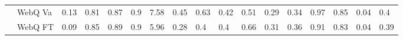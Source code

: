 \begin{table*}[t]
{\begin{tabular}{@{}ll|llll|llll|lll|ll|ll@{}}
                           & WebQ Va              & 0.13                                                                    & 0.81                                                                     & 0.87                                                                  & 0.9                                                                   & 7.58                                                                    & 0.45                                                                  & 0.63                                                                  & 0.42                                                                   & 0.51                                                                    & 0.29                                                                  & 0.34                                                                   & 0.97                                                                   & 0.85                                                                   & 0.04                                                                     & 0.4                                                                      \\
                           & WebQ FT              & 0.09                                                                    & 0.85                                                                     & 0.89                                                                  & 0.9                                                                   & 5.96                                                                    & 0.28                                                                  & 0.4                                                                   & 0.4                                                                    & 0.66                                                                    & 0.31                                                                  & 0.36                                                                   & 0.91                                                                   & 0.83                                                                   & 0.04                                                                     & 0.39                                                                     \\ \midrule

\end{tabular}}
\end{table*}
